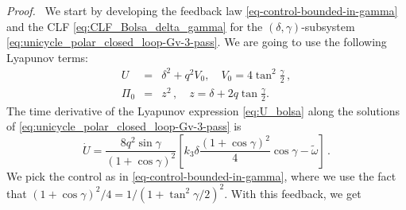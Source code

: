 \documentclass[10pt,a4paper]{amsart}
\renewenvironment{proof}[1][Proof]{\par\pushQED{\qed}\normalfont\textit{#1.}~}{\popQED\par}
\begin{document}
\begin{proof}
We start by developing the feedback law \eqref{eq-control-bounded-in-gamma} and the CLF \eqref{eq:CLF_Bolsa_delta_gamma} for the $(\delta, \gamma)$-subsystem   \eqref{eq:unicycle_polar_closed_loop-Gv-3-pass}. 
We are going to use the following Lyapunov terms:
\begin{eqnarray}
U &=& \delta^2 +   q^2 V_0, \quad V_0 = 4 \tan^2\frac{\gamma}{2}\,,  \label{eq:U_bolsa} \\
\Pi_0 &=& z^2\,, \quad z = \delta + 2 q \tan\frac{\gamma}{2}.
\end{eqnarray}
The time derivative of the Lyapunov expression \eqref{eq:U_bolsa} along the solutions of \eqref{eq:unicycle_polar_closed_loop-Gv-3-pass} is
\begin{equation}
\dot U  =  \frac{8 q^2 \sin\gamma}{(1+\cos\gamma)^2} \left[ k_3 \delta \frac{(1+\cos\gamma)^2}{4} \cos\gamma 
- \tilde{\omega}\right]\,.
\end{equation}
We pick the control as in \eqref{eq-control-bounded-in-gamma}, where we use the fact that $(1+\cos\gamma)^2/4 = 1/(1+\tan^2 \gamma/2)^2$. With this feedback, we get
\begin{equation}

\end{equation}
\end{proof}
\end{document}

